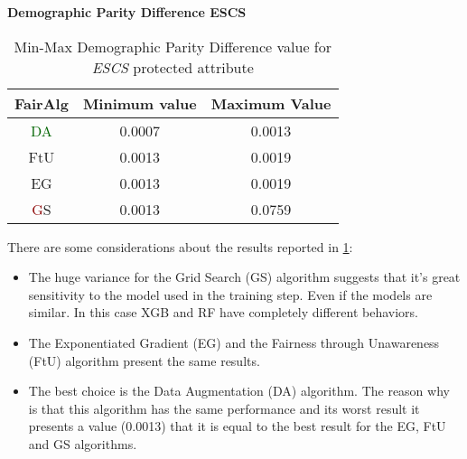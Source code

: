 \textbf{Demographic Parity Difference ESCS}
\begin{table}
    \centering
    \begin{tabular}{|c|c|c|}
        \hline
        \textbf{FairAlg} & \textbf{Minimum value} & \textbf{Maximum Value} \\
        \hline
        \textcolor{darkgreen}{DA} & 0.0007 & 0.0013 \\
        \hline
        FtU & 0.0013 & 0.0019 \\
        \hline
        EG & 0.0013 & 0.0019 \\
        \hline
        \textcolor{darkred}GS & 0.0013 & 0.0759 \\
        \hline
    \end{tabular}
    \caption{Min-Max Demographic Parity Difference value for \emph{ESCS} protected attribute}
    \label{tab:e_dpd}
\end{table}

There are some considerations about the results reported in \cref{tab:e_dpd}:

\begin{itemize}

    \item The huge variance for the Grid Search (GS) algorithm suggests that it's great sensitivity to the model used in the training step. Even if the models are similar. In this case XGB and RF have completely different behaviors.

    \item The Exponentiated Gradient (EG) and the Fairness through Unawareness (FtU) algorithm present the same results.

    \item The best choice is the Data Augmentation (DA) algorithm. The reason why is that this algorithm has the same performance and its worst result it presents a value (0.0013) that it is equal to the best result for the EG, FtU and GS algorithms.
\end{itemize}